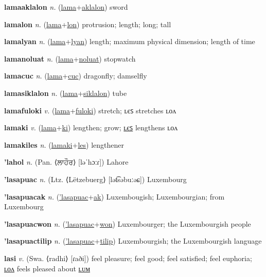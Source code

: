 \textbf{\hypertarget{lamaaklalon}{lamaaklalon}} \textit{n.} (\hyperlink{lama}{lama}+\allowbreak \hyperlink{aklalon}{aklalon})
sword

\textbf{\hypertarget{lamalon}{lamalon}} \textit{n.} (\hyperlink{lama}{lama}+\allowbreak \hyperlink{lon}{lon})
protrusion; length; long; tall

\textbf{\hypertarget{lamalyan}{lamalyan}} \textit{n.} (\hyperlink{lama}{lama}+\allowbreak \hyperlink{lyan}{lyan})
length; maximum physical dimension; length of time

\textbf{\hypertarget{lamanoluat}{lamanoluat}} \textit{n.} (\hyperlink{lama}{lama}+\allowbreak \hyperlink{noluat}{noluat})
stopwatch

\textbf{\hypertarget{lamacuc}{lamacuc}} \textit{n.} (\hyperlink{lama}{lama}+\allowbreak \hyperlink{cuc}{cuc})
dragonfly; damselfly

\textbf{\hypertarget{lamasiklalon}{lamasiklalon}} \textit{n.} (\hyperlink{lama}{lama}+\allowbreak \hyperlink{siklalon}{siklalon})
tube

\textbf{\hypertarget{lamafuloki}{lamafuloki}} \textit{v.} (\hyperlink{lama}{lama}+\allowbreak \hyperlink{fuloki}{fuloki})
stretch; ʟєꜱ stretches ʟᴏᴧ

\textbf{\hypertarget{lamaki}{lamaki}} \textit{v.} (\hyperlink{lama}{lama}+\allowbreak \hyperlink{ki}{ki})
lengthen; grow; \hyperlink{lamakiles}{ʟєꜱ} lengthens ʟᴏᴧ

\textbf{\hypertarget{lamakiles}{lamakiles}} \textit{n.} (\hyperlink{lamaki}{lamaki}+\allowbreak \hyperlink{les}{les})
lengthener

\textbf{\hypertarget{'lahol}{'lahol}} \textit{n.} (Pan. ⟨{\gurmukhi{}ਲਾਹੌਰ}⟩ [ləˈhɔːɾ])
Lahore

\textbf{\hypertarget{'lasapuac}{'lasapuac}} \textit{n.} (Ltz. ⟨Lëtzebuerg⟩ [lət͡səbuːəɕ])
Luxembourg

\textbf{\hypertarget{'lasapuacak}{'lasapuacak}} \textit{n.} (\hyperlink{'lasapuac}{'lasapuac}+\allowbreak \hyperlink{ak}{ak})
Luxembougish; Luxembourgian; from Luxembourg

\textbf{\hypertarget{'lasapuacwon}{'lasapuacwon}} \textit{n.} (\hyperlink{'lasapuac}{'lasapuac}+\allowbreak \hyperlink{won}{won})
Luxembourger; the Luxembourgish people

\textbf{\hypertarget{'lasapuactilip}{'lasapuactilip}} \textit{n.} (\hyperlink{'lasapuac}{'lasapuac}+\allowbreak \hyperlink{tilip}{tilip})
Luxembourgish; the Luxembourgish language

\textbf{\hypertarget{lasi}{lasi}} \textit{v.} (Swa. ⟨radhi⟩ [ɾaði])
feel pleasure; feel good; feel satisfied; feel euphoria; \hyperlink{lasilon}{ʟᴏᴧ} feels pleased about \hyperlink{lasilum}{ʟᴜᴍ}

